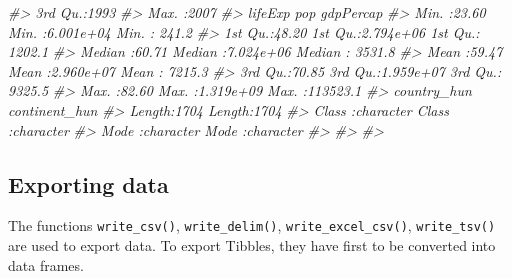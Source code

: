 \documentclass[
]{book}
\newenvironment{Shaded}{\begin{snugshade}}{\end{snugshade}}
\newcommand{\CommentTok}[1]{\textcolor[rgb]{0.56,0.35,0.01}{\textit{#1}}}
\begin{document}
\begin{Shaded}
\begin{Highlighting}[]
\CommentTok{\#\textgreater{}                                        3rd Qu.:1993  }
\CommentTok{\#\textgreater{}                                        Max.   :2007  }
\CommentTok{\#\textgreater{}     lifeExp           pop              gdpPercap       }
\CommentTok{\#\textgreater{}  Min.   :23.60   Min.   :6.001e+04   Min.   :   241.2  }
\CommentTok{\#\textgreater{}  1st Qu.:48.20   1st Qu.:2.794e+06   1st Qu.:  1202.1  }
\CommentTok{\#\textgreater{}  Median :60.71   Median :7.024e+06   Median :  3531.8  }
\CommentTok{\#\textgreater{}  Mean   :59.47   Mean   :2.960e+07   Mean   :  7215.3  }
\CommentTok{\#\textgreater{}  3rd Qu.:70.85   3rd Qu.:1.959e+07   3rd Qu.:  9325.5  }
\CommentTok{\#\textgreater{}  Max.   :82.60   Max.   :1.319e+09   Max.   :113523.1  }
\CommentTok{\#\textgreater{}  country\_hun        continent\_hun     }
\CommentTok{\#\textgreater{}  Length:1704        Length:1704       }
\CommentTok{\#\textgreater{}  Class :character   Class :character  }
\CommentTok{\#\textgreater{}  Mode  :character   Mode  :character  }
\CommentTok{\#\textgreater{}                                       }
\CommentTok{\#\textgreater{}                                       }
\CommentTok{\#\textgreater{} }
\end{Highlighting}
\end{Shaded}

\hypertarget{tr-export}{%
\subsection{Exporting data}\label{tr-export}}

The functions \texttt{write\_csv()}, \texttt{write\_delim()}, \texttt{write\_excel\_csv()}, \texttt{write\_tsv()} are used to export data. To export Tibbles, they have first to be converted into data frames.
\end{document}
